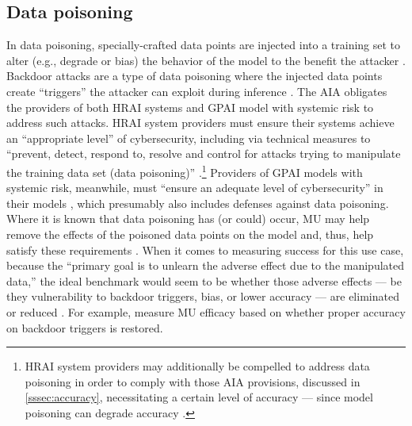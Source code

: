 \subsection{Data poisoning} 
In data poisoning, specially-crafted data points are injected into a training set to alter (e.g., degrade or bias) the behavior of the model to the benefit the attacker \citep{DBLP:conf/icml/BiggioNL12}. Backdoor attacks are a type of data poisoning where the injected data points create ``triggers'' the attacker can exploit during inference \citep{lin2021mlattackmodelsadversarial}. The AIA obligates the providers of both HRAI systems and GPAI model with systemic risk to address such attacks. HRAI system providers must ensure their systems achieve an ``appropriate level'' of  cybersecurity, including via technical measures to ``prevent, detect, respond to, resolve and control for attacks trying to manipulate the training data set (data poisoning)'' \citep[Art. 15(5)]{european_union_ai_act_2024}.\footnote{HRAI system providers may additionally be compelled to address data poisoning in order to comply with those AIA provisions, discussed in \ref{sssec:accuracy}, necessitating a certain level of accuracy --- since model poisoning can degrade accuracy \citep{nawshin2024assessing}.} Providers of GPAI models with systemic risk, meanwhile, must ``ensure an adequate level of cybersecurity'' in their models \citep[Art. 55.d]{european_union_ai_act_2024}, which presumably also includes defenses against data poisoning. Where it is known that data poisoning has (or could) occur, MU may help remove the effects of the poisoned data points on the model and, thus, help satisfy these requirements  \citep{Xu_2024, liu2024threatsattacksdefensesmachine, CaoYang2015, 10.1145/3196494.3196517, 281308}. When it comes to measuring success for this use case, because the ``primary goal is to unlearn the adverse effect due to the manipulated data,'' the ideal benchmark would seem to be whether those adverse effects --- be they vulnerability to backdoor triggers, bias, or lower accuracy --- are eliminated or reduced \citep{goel2024correctivemachineunlearning}. For example, \citet{goel2024correctivemachineunlearning} measure MU efficacy based on whether proper accuracy on backdoor triggers is restored.

